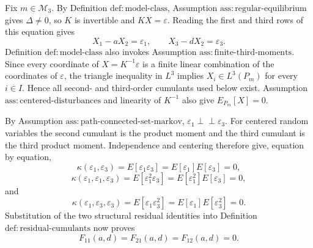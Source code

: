 Fix \(m\in\mathcal M_3\).  By Definition \(\mathrm{def:model\mbox{-}class}\), Assumption \(\mathrm{ass:regular\mbox{-}equilibrium}\) gives \(\Delta\neq0\), so \(K\) is invertible and \(KX=\varepsilon\).  Reading the first and third rows of this equation gives
\[
X_1-aX_2=\varepsilon_1,
\qquad
X_3-dX_2=\varepsilon_3.
\]
Definition \(\mathrm{def:model\mbox{-}class}\) also invokes Assumption \(\mathrm{ass:finite\mbox{-}third\mbox{-}moments}\).  Since every coordinate of \(X=K^{-1}\varepsilon\) is a finite linear combination of the coordinates of \(\varepsilon\), the triangle inequality in \(L^3\) implies \(X_i\in L^3(P_m)\) for every \(i\in I\).  Hence all second- and third-order cumulants used below exist.  Assumption \(\mathrm{ass:centered\mbox{-}disturbances}\) and linearity of \(K^{-1}\) also give \(E_{P_m}[X]=0\).

By Assumption \(\mathrm{ass:path\mbox{-}connected\mbox{-}set\mbox{-}markov}\), \(\varepsilon_1\perp\!\!\!\perp\varepsilon_3\).  For centered random variables the second cumulant is the product moment and the third cumulant is the third product moment.  Independence and centering therefore give, equation by equation,
\[
\kappa(\varepsilon_1,\varepsilon_3)
=E[\varepsilon_1\varepsilon_3]
=E[\varepsilon_1]E[\varepsilon_3]=0,
\]
\[
\kappa(\varepsilon_1,\varepsilon_1,\varepsilon_3)
=E[\varepsilon_1^2\varepsilon_3]
=E[\varepsilon_1^2]E[\varepsilon_3]=0,
\]
and
\[
\kappa(\varepsilon_1,\varepsilon_3,\varepsilon_3)
=E[\varepsilon_1\varepsilon_3^2]
=E[\varepsilon_1]E[\varepsilon_3^2]=0.
\]
Substitution of the two structural residual identities into Definition \(\mathrm{def:residual\mbox{-}cumulants}\) now proves
\[
F_{11}(a,d)=F_{21}(a,d)=F_{12}(a,d)=0.
\]


